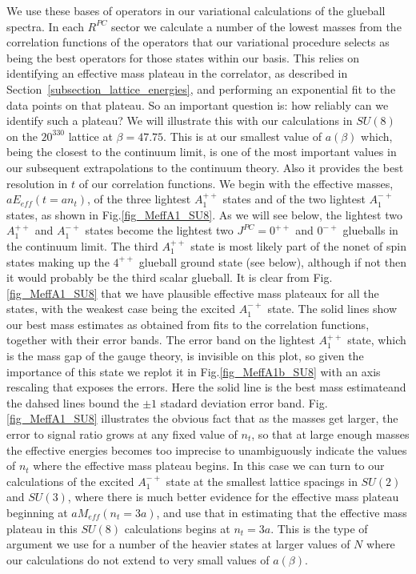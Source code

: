 \documentclass[12pt]{article}
\begin{document}
We use these bases of operators in our variational calculations of the glueball spectra.
In each $R^{PC}$ sector we calculate a number of the lowest masses from the
correlation functions of the operators that our variational procedure selects as being
the best operators for those states within our basis. This relies on identifying an effective
mass plateau in the correlator, as described in Section~\ref{subsection_lattice_energies},
and performing an exponential fit to the data points on that plateau. So an important
question is: how reliably can we identify such a plateau? We will illustrate this
with our calculations in $SU(8)$ on the $20^330$ lattice at $\beta=47.75$. This
is at our smallest value of $a(\beta)$ which, being the closest to the continuum
limit, is one of the most important values in our subsequent extrapolations to the
continuum theory. Also it provides the best resolution in $t$ of our correlation
functions. We begin with the effective masses, $aE_{eff}(t=an_t)$, of the three
lightest $A_1^{++}$ states and of the two lightest $A_1^{-+}$ states, as shown in
Fig.\ref{fig_MeffA1_SU8}. As we will see below, the lightest two $A_1^{++}$ and
$A_1^{-+}$ states become the lightest two $J^{PC}=0^{++}$ and $0^{-+}$ glueballs
in the continuum limit. The third $A_1^{++}$ state is most likely part of the nonet of
spin states making up the $4^{++}$ glueball ground state (see below), although if not
then it would probably be the third scalar glueball. 
It is clear from Fig.\ref{fig_MeffA1_SU8}
that we have plausible effective mass plateaux for all the states, with the
weakest case being the excited $A_1^{-+}$ state. The solid lines show our
best mass estimates as obtained from fits to the correlation functions,
together with their error bands. The error band on the lightest  $A_1^{++}$
state, which is the mass gap of the gauge theory, is invisible on this plot,
so given the importance of this state we replot it in  Fig.\ref{fig_MeffA1b_SU8}
with an axis rescaling that exposes the errors. Here the solid line is the
best mass estimateand the dahsed lines bound the $\pm 1$ stadard deviation
error band. Fig.\ref{fig_MeffA1_SU8} illustrates
the obvious fact that as the masses get larger, the error to signal ratio
grows at any fixed value of $n_t$, so that at large enough masses the effective 
energies becomes too imprecise to unambiguously indicate the values of $n_t$
where the effective mass plateau begins. In this case we can turn to our
calculations of the excited $A_1^{-+}$ state at the smallest lattice spacings
in $SU(2)$ and $SU(3)$, where there is much better evidence for the effective
mass plateau beginning at $aM_{eff}(n_t=3a)$, and use that in estimating that
the effective mass plateau in this $SU(8)$ calculations begins at $n_t=3a$.
This is the type of argument we use for a number of the heavier states
at larger values of $N$ where our calculations do not extend to very small
values of $a(\beta)$.
\end{document}
